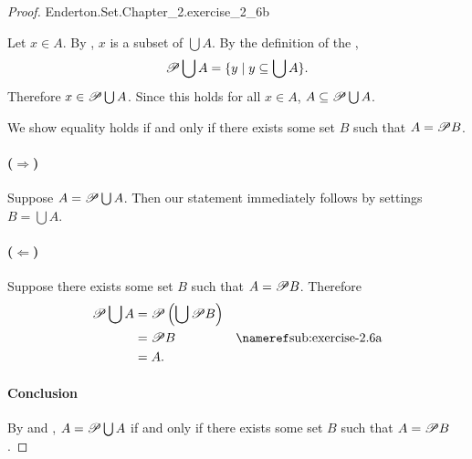 \documentclass{report}
\begin{document}
\begin{proof}

    {Enderton.Set.Chapter\_2.exercise\_2\_6b}

  Let $x \in A$.
  By , $x$ is a subset of $\bigcup A$.
  By the definition of the ,
    $$\mathscr{P}\bigcup A = \{ y \mid y \subseteq \bigcup A \}.$$
  Therefore $x \in \mathscr{P}\bigcup A$.
  Since this holds for all $x \in A$, $A \subseteq \mathscr{P}\bigcup A$.

  \suitdivider

  We show equality holds if and only if there exists some set $B$ such that
    $A = \mathscr{P}B$.

  \paragraph{($\Rightarrow$)}%

    Suppose $A = \mathscr{P}\bigcup A$.
    Then our statement immediately follows by settings $B = \bigcup A$.

  \paragraph{($\Leftarrow$)}%

    Suppose there exists some set $B$ such that $A = \mathscr{P}B$.
    Therefore
      \begin{align*}
        \powerset{\bigcup A}
          & = \powerset{\left(\bigcup {\powerset {B}}\right)} \\
          & = \powerset{B} & \textref{sub:exercise-2.6a} \\
          & = A.
      \end{align*}

  \paragraph{Conclusion}%

    By  and ,
      $A = \mathscr{P}\bigcup A$ if and only if there exists some set $B$ such
      that $A = \mathscr{P}B$.

\end{proof}

\subsection{}%
\end{document}
